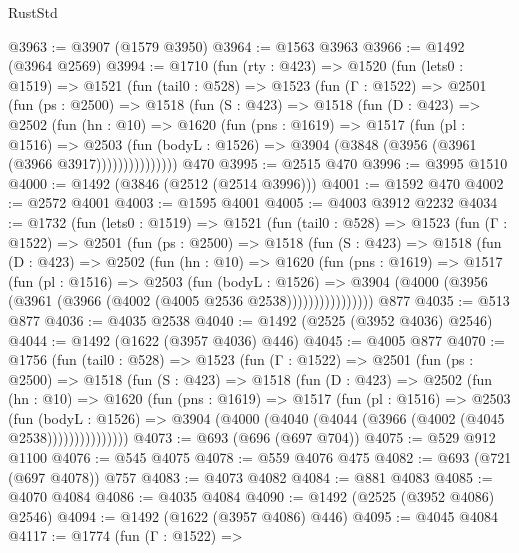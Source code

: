 \begin{lexlean}{RustStd}
\begin{coremodule}
{\begin{coremodule}
{{{{{{{{{{{{{@3963 := @3907 (@1579 @3950)
@3964 := @1563 @3963
@3966 := @1492 (@3964 @2569)
@3994 := @1710
    (fun (rty : @423) =>
    @1520
      (fun (lets0 : @1519) =>
      @1521
        (fun (tail0 : @528) =>
        @1523
          (fun (Γ : @1522) =>
          @2501
            (fun (ps : @2500) =>
            @1518
              (fun (S : @423) =>
              @1518
                (fun (D : @423) =>
                @2502
                  (fun (hn : @10) =>
                  @1620
                    (fun (pns : @1619) =>
                    @1517
                      (fun (pl : @1516) =>
                      @2503
                        (fun (bodyL : @1526) =>
                        @3904 (@3848 (@3956 (@3961 (@3966 @3917)))))))))))))))
    @470
@3995 := @2515 @470
@3996 := @3995 @1510
@4000 := @1492 (@3846 (@2512 (@2514 @3996)))
@4001 := @1592 @470
@4002 := @2572 @4001
@4003 := @1595 @4001
@4005 := @4003 @3912 @2232
@4034 := @1732
    (fun (lets0 : @1519) =>
    @1521
      (fun (tail0 : @528) =>
      @1523
        (fun (Γ : @1522) =>
        @2501
          (fun (ps : @2500) =>
          @1518
            (fun (S : @423) =>
            @1518
              (fun (D : @423) =>
              @2502
                (fun (hn : @10) =>
                @1620
                  (fun (pns : @1619) =>
                  @1517
                    (fun (pl : @1516) =>
                    @2503
                      (fun (bodyL : @1526) =>
                      @3904 (@4000 (@3956 (@3961 (@3966 (@4002 (@4005 @2536 @2538))))))))))))))))
    @877
@4035 := @513 @877
@4036 := @4035 @2538
@4040 := @1492 (@2525 (@3952 @4036) @2546)
@4044 := @1492 (@1622 (@3957 @4036) @446)
@4045 := @4005 @877
@4070 := @1756
    (fun (tail0 : @528) =>
    @1523
      (fun (Γ : @1522) =>
      @2501
        (fun (ps : @2500) =>
        @1518
          (fun (S : @423) =>
          @1518
            (fun (D : @423) =>
            @2502
              (fun (hn : @10) =>
              @1620
                (fun (pns : @1619) =>
                @1517
                  (fun (pl : @1516) =>
                  @2503
                    (fun (bodyL : @1526) =>
                    @3904 (@4000 (@4040 (@4044 (@3966 (@4002 (@4045 @2538)))))))))))))))
@4073 := @693 (@696 (@697 @704))
@4075 := @529 @912 @1100
@4076 := @545 @4075
@4078 := @559 @4076 @475
@4082 := @693 (@721 (@697 @4078)) @757
@4083 := @4073 @4082
@4084 := @881 @4083
@4085 := @4070 @4084
@4086 := @4035 @4084
@4090 := @1492 (@2525 (@3952 @4086) @2546)
@4094 := @1492 (@1622 (@3957 @4086) @446)
@4095 := @4045 @4084
@4117 := @1774
    (fun (Γ : @1522) =>
}}}}}}}}}}}}}
\end{coremodule}}
\end{coremodule}
\end{lexlean}

